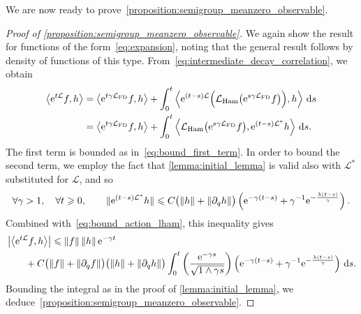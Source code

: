\documentclass[11pt,a4paper]{article}
\newcommand{\e}{\mathrm{e}}
\renewcommand{\d}{\mathrm d}
\theoremstyle{plain}
\numberwithin{equation}{section}
\renewcommand{\leq}{\leqslant}
\renewcommand{\geq}{\geqslant}
\begin{document}
We are now ready to prove~\cref{proposition:semigroup_meanzero_observable}.
\begin{proof}
    [Proof of \cref{proposition:semigroup_meanzero_observable}]
    We again show the result for functions of the form~\eqref{eq:expansion},
    noting that the general result follows by density of functions of this type.
    From~\eqref{eq:intermediate_decay_correlation}, we obtain
    \begin{align}
        \notag
        \ip{\e^{t \mathcal L} f}{h}
        &= \ip{\e^{t \gamma \mathcal L_{\rm FD}} f}{h}
        + \int_{0}^t \ip{\e^{(t-s) \mathcal L} \Bigl( \mathcal L_{\rm Ham} \bigl(\e^{s \gamma \mathcal L_{\rm FD}} f\bigr) \Bigr)}{h} \, \d s \\
        &= \ip{\e^{t \gamma \mathcal L_{\rm FD}} f}{h}
        + \int_{0}^t \ip{ \mathcal L_{\rm Ham} \bigl(\e^{s \gamma \mathcal L_{\rm FD}} f\bigr) }{\e^{(t-s) \mathcal L^*}  h} \, \d s.
    \end{align}
    The first term is bounded as in~\eqref{eq:bound_first_term}.
    In order to bound the second term,
    we employ the fact that \cref{lemma:initial_lemma} is valid also with $\mathcal L^*$ substituted for $\mathcal L$,
    and so
    \[
        \forall \gamma > 1, \quad
        \forall t \geq 0, \qquad
        \norm*{\e^{(t-s)\mathcal L^*} h}
        \leq C \bigl( \norm{h} + \norm{\partial_q h} \bigr)
        \left( \e^{- \gamma (t-s)} + \gamma^{-1} \e^{-\frac{\lambda (t-s)}{\gamma}} \right).
    \]
    Combined with~\eqref{eq:bound_action_lham},
    this inequality gives
    \begin{align*}
        & \abs{ \ip{\e^{t \mathcal L} f}{h}}
        \leq \norm{f} \norm{h} \e^{-\gamma t} \\
        & \qquad + C \bigl( \norm{f} + \norm{\partial_q f} \bigr) \bigl( \norm{h} + \norm{\partial_q h} \bigr)
         \int_{0}^{t}  \left( \frac{\e^{-\gamma s}}{\sqrt{1 \wedge \gamma s}} \right)
         \left(  \e^{- \gamma (t-s)} + \gamma^{-1} \e^{-\frac{\lambda (t-s)}{\gamma}} \right) \, \d s.
    \end{align*}
    Bounding the integral as in the proof of \cref{lemma:initial_lemma},
    we deduce~\cref{proposition:semigroup_meanzero_observable}.
\end{proof}
\end{document}

